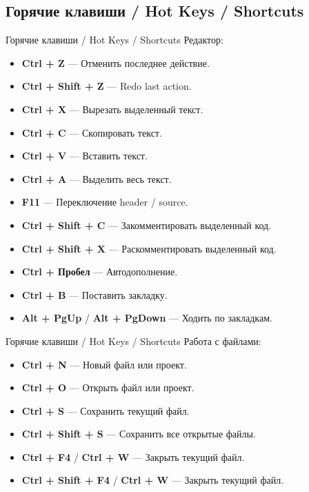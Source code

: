 \subsection{Горячие клавиши / Hot Keys / Shortcuts}

\begin{frame}[t]{Горячие клавиши / Hot Keys / Shortcuts}
  Редактор:
  \begin{itemize}
    \item \textbf{Ctrl + Z} --- Отменить последнее действие. 
    \item \textbf{Ctrl + Shift + Z} --- Redo last action. 
    \item \textbf{Ctrl + X} --- Вырезать выделенный текст. 
    \item \textbf{Ctrl + C} --- Скопировать текст. 
    \item \textbf{Ctrl + V} --- Вставить текст. 
    \item \textbf{Ctrl + A} --- Выделить весь текст. 
    \item \textbf{F11} --- Переключение header / source. 
    \item \textbf{Ctrl + Shift + C} --- Закомментировать выделенный код. 
    \item \textbf{Ctrl + Shift + X} --- Раскомментировать выделенный код. 
    \item \textbf{Ctrl + Пробел} --- Автодополнение. 
    \item \textbf{Ctrl + B} --- Поставить закладку. 
    \item \textbf{Alt + PgUp} / \textbf{Alt + PgDown} --- Ходить по закладкам. 
  \end{itemize}
\end{frame}

\begin{frame}[t]{Горячие клавиши / Hot Keys / Shortcuts}
  Работа с файлами:
  \begin{itemize}
    \item \textbf{Ctrl + N} --- Новый файл или проект. 
    \item \textbf{Ctrl + O} --- Открыть файл или проект. 
    \item \textbf{Ctrl + S} --- Сохранить текущий файл. 
    \item \textbf{Ctrl + Shift + S} --- Сохранить все открытые файлы. 
    \item \textbf{Ctrl + F4} / \textbf{Ctrl + W} --- Закрыть текущий файл. 
    \item \textbf{Ctrl + Shift + F4} / \textbf{Ctrl + W} --- Закрыть текущий файл.     
  \end{itemize}
\end{frame}

